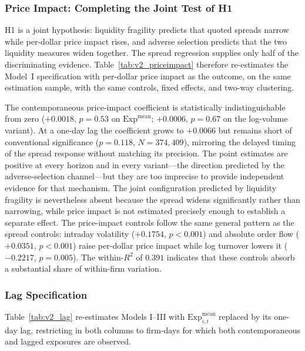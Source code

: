 \documentclass{article}
\theoremstyle{plain}
\begin{document}
\subsubsection{Price Impact: Completing the Joint Test of H1}
\label{sec:results_priceimpact}

H1 is a joint hypothesis: liquidity fragility predicts that quoted spreads narrow while per-dollar price impact rises, and adverse selection predicts that the two liquidity measures widen together. The spread regression supplies only half of the discriminating evidence. Table~\ref{tab:v2_priceimpact} therefore re-estimates the Model~I specification with per-dollar price impact as the outcome, on the same estimation sample, with the same controls, fixed effects, and two-way clustering.



The contemporaneous price-impact coefficient is statistically indistinguishable from zero ($+0.0018$, $p=0.53$ on $\mathrm{Exp}^{\text{mean}}$; $+0.0006$, $p=0.67$ on the log-volume variant). At a one-day lag the coefficient grows to $+0.0066$ but remains short of conventional significance ($p=0.118$, $N=374{,}409$), mirroring the delayed timing of the spread response without matching its precision. The point estimates are positive at every horizon and in every variant---the direction predicted by the adverse-selection channel---but they are too imprecise to provide independent evidence for that mechanism. The joint configuration predicted by liquidity fragility is nevertheless absent because the spread widens significantly rather than narrowing, while price impact is not estimated precisely enough to establish a separate effect. The price-impact controls follow the same general pattern as the spread controls: intraday volatility ($+0.1754$, $p<0.001$) and absolute order flow ($+0.0351$, $p<0.001$) raise per-dollar price impact while log turnover lowers it ($-0.2217$, $p=0.005$). The within-$R^2$ of $0.391$ indicates that these controls absorb a substantial share of within-firm variation.

\subsubsection{Lag Specification}
\label{sec:results_lag}

Table~\ref{tab:v2_lag} re-estimates Models I--III with $\mathrm{Exp}^{\text{mean}}_{i,t}$ replaced by its one-day lag, restricting in both columns to firm-days for which both contemporaneous and lagged exposures are observed.
\end{document}
